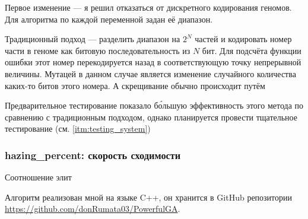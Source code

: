Первое изменение — я решил отказаться от дискретного кодирования геномов.
Для алгоритма по каждой переменной задан её диапазон.

Традиционный подход — разделить диапазон на $2^N$ частей и кодировать номер части в геноме как битовую последовательность из $N$ бит.
Для подсчёта функции ошибки этот номер перекодируется назад в соответствующую точку непрерывной величины.
Мутацей в данном случае является изменение случайного количества каких-то битов этого номера.
А скрещивание обычно происходит путём

Предварительное тестирование показало бо́льшую эффективность этого метода по сравнению с традиционным подходом, однако планируется провести тщательное тестирование (см. \ref{itm:testing_system})

\subsubsection{hazing\_percent: скорость сходимости}\label{subsubsec:hazing}
Соотношение элит

Алгоритм реализован мной на языке C++, он хранится в GitHub репозитории \href{https://github.com/donRumata03/PowerfulGA}{https://github.com/donRumata03/PowerfulGA}.